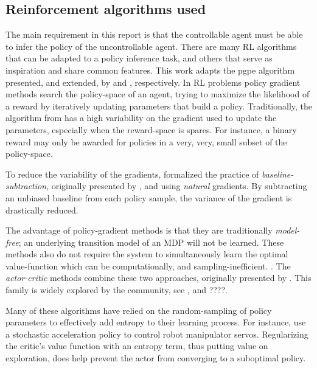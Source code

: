 \subsection{Reinforcement algorithms used}
    The main requirement in this report is that the controllable agent must be able to infer the policy of the
    uncontrollable agent. There are many \ac{RL} algorithms that can be adapted to a policy inference task, and others
    that serve as inspiration and share common features. This work adapts the \ac{pgpe} algorithm presented, and
    extended, by \cite{sehnke2010parameter} and \cite{tangkaratt2014model}, respectively. In \ac{RL} problems policy
    gradient methods search the policy-space of an agent, trying to maximize the likelihood of a reward by iteratively
    updating parameters that build a policy. Traditionally, the \reinforce algorithm from \cite{williams1992simple} has
    a high variability on the gradient used to update the parameters, especially when the reward-space is spares. For
    instance, a binary reward may only be awarded for policies in a very, very, small subset of the policy-space.

    To reduce the variability of the gradients, \cite{peters2008reinforcement} formalized the practice of
    \textit{baseline-subtraction}, originally presented by \cite{williams1992simple}, and using \textit{natural}
    gradients. By subtracting an unbiased baseline from each policy sample, the variance of the gradient is drastically
    reduced.

    The advantage of policy-gradient methods is that they are traditionally \textit{model-free}; an underlying
    transition model of an \ac{MDP} will not be learned. These methods also do not require the system to simultaneously
    learn the optimal value-function which can be computationally, and sampling-inefficient.
    . The \textit{actor-critic} methods combine these two approaches, originally presented by \cite{konda2000actor}.
This family is widely explored by the community, see \cite{peters2008reinforcement}, and ????.


    Many of these algorithms have relied on the random-sampling of policy parameters to effectively add entropy to their
    learning process. For instance, \cite{peters2008reinforcement} use a stochastic acceleration policy to control robot
    manipulator servos. Regularizing the critic's value function with an entropy term, thus putting value on
    exploration, \cite{nachum2017bridging} does help prevent the actor from converging to a suboptimal policy.

